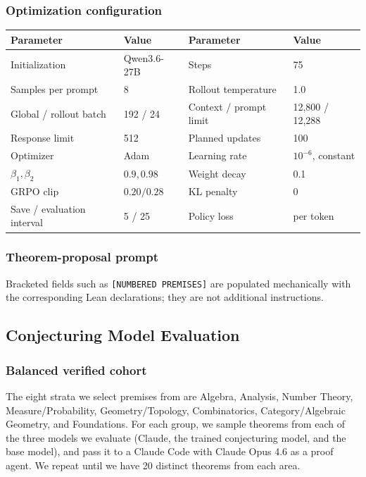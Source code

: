 \subsubsection{Optimization configuration}

\begin{center}
\small
\begin{tabular}{@{}ll@{\qquad}ll@{}}
\toprule
Parameter & Value & Parameter & Value \\
\midrule
Initialization & Qwen3.6-27B & Steps & 75 \\
Samples per prompt & 8 & Rollout temperature & 1.0 \\
Global / rollout batch & 192 / 24 & Context / prompt limit & 12,800 / 12,288 \\
Response limit & 512 & Planned updates & 100 \\
Optimizer & Adam & Learning rate & $10^{-6}$, constant \\
$\beta_1,\beta_2$ & $0.9,0.98$ & Weight decay & 0.1 \\
GRPO clip & $0.20/0.28$ & KL penalty & $0$ \\
Save / evaluation interval & 5 / 25 & Policy loss & per token \\
\bottomrule
\end{tabular}
\end{center}

\subsubsection{Theorem-proposal prompt}

Bracketed fields such as \texttt{[NUMBERED PREMISES]} are populated mechanically
with the corresponding Lean declarations; they are not additional instructions.



\subsection{Conjecturing Model Evaluation}
\label{app:forward-eval}

\subsubsection{Balanced verified cohort}

The eight strata we select premises from are Algebra, Analysis, Number Theory, Measure/Probability, Geometry/Topology, Combinatorics, Category/Algebraic Geometry, and Foundations.
For each group, we sample theorems from each of the three models we evaluate (Claude, the trained conjecturing model, and the base model), and pass it to a Claude Code with Claude Opus 4.6 as a proof agent. We repeat until we have 20 distinct theorems from each area.


